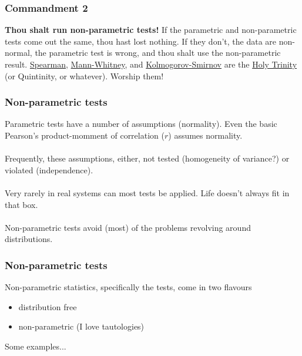 \documentclass{beamer}
\begin{document}
  
  
  \begin{frame}
    \frametitle{Commandment 2}
    \textbf{Thou shalt run non-parametric tests! }
    If the parametric and non-parametric tests come out the same, thou hast lost nothing. 
    If they don't, the data are non-normal, the parametric test is wrong, and thou shalt use the non-parametric result. 
    \underline{Spearman}, \underline{Mann-Whitney}, and \underline{Kolmogorov-Smirnov} are the \underline{Holy Trinity} (or Quintinity, or whatever). 
    Worship them!
  \end{frame}
  
  
  
  \begin{frame}
    \frametitle{Non-parametric tests}
    Parametric tests have a number of assumptions (normality).
    Even the basic Pearson's product-momment of correlation (\(r\)) assumes normality.
    \\~\\
    Frequently, these assumptions, either, not tested (homogeneity of variance?)
    or violated (independence).
    \\~\\
    Very rarely in real systems can most tests be applied. 
    Life doesn't always fit in that box.
    \\~\\
    Non-parametric tests avoid (most) of the problems revolving around distributions.
  \end{frame}
  
  
  
  \begin{frame}
    \frametitle{Non-parametric tests}
    Non-parametric statistics, specifically the tests, come in two flavours
    
    \begin{itemize}
      \item distribution free
      \item non-parametric (I love tautologies)
    \end{itemize}
    
    Some examples...
  \end{frame}
  
  
  
\end{document}

